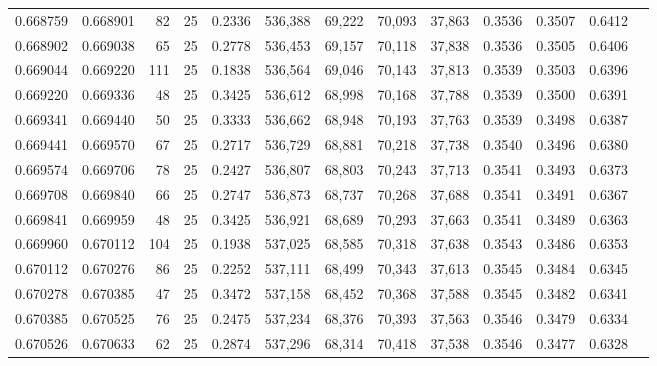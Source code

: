 \begin{tabular}{rrrrrrrrrrrrr}
0.668759 & 0.668901 &    82 &  25 &                                     0.2336 & 536,388 &  69,222 &  70,093 &  37,863 & 0.3536 & 0.3507 & 0.6412 \\
0.668902 & 0.669038 &    65 &  25 &                                     0.2778 & 536,453 &  69,157 &  70,118 &  37,838 & 0.3536 & 0.3505 & 0.6406 \\
0.669044 & 0.669220 &   111 &  25 &                                     0.1838 & 536,564 &  69,046 &  70,143 &  37,813 & 0.3539 & 0.3503 & 0.6396 \\
0.669220 & 0.669336 &    48 &  25 &                                     0.3425 & 536,612 &  68,998 &  70,168 &  37,788 & 0.3539 & 0.3500 & 0.6391 \\
0.669341 & 0.669440 &    50 &  25 &                                     0.3333 & 536,662 &  68,948 &  70,193 &  37,763 & 0.3539 & 0.3498 & 0.6387 \\
0.669441 & 0.669570 &    67 &  25 &                                     0.2717 & 536,729 &  68,881 &  70,218 &  37,738 & 0.3540 & 0.3496 & 0.6380 \\
0.669574 & 0.669706 &    78 &  25 &                                     0.2427 & 536,807 &  68,803 &  70,243 &  37,713 & 0.3541 & 0.3493 & 0.6373 \\
0.669708 & 0.669840 &    66 &  25 &                                     0.2747 & 536,873 &  68,737 &  70,268 &  37,688 & 0.3541 & 0.3491 & 0.6367 \\
0.669841 & 0.669959 &    48 &  25 &                                     0.3425 & 536,921 &  68,689 &  70,293 &  37,663 & 0.3541 & 0.3489 & 0.6363 \\
0.669960 & 0.670112 &   104 &  25 &                                     0.1938 & 537,025 &  68,585 &  70,318 &  37,638 & 0.3543 & 0.3486 & 0.6353 \\
0.670112 & 0.670276 &    86 &  25 &                                     0.2252 & 537,111 &  68,499 &  70,343 &  37,613 & 0.3545 & 0.3484 & 0.6345 \\
0.670278 & 0.670385 &    47 &  25 &                                     0.3472 & 537,158 &  68,452 &  70,368 &  37,588 & 0.3545 & 0.3482 & 0.6341 \\
0.670385 & 0.670525 &    76 &  25 &                                     0.2475 & 537,234 &  68,376 &  70,393 &  37,563 & 0.3546 & 0.3479 & 0.6334 \\
0.670526 & 0.670633 &    62 &  25 &                                     0.2874 & 537,296 &  68,314 &  70,418 &  37,538 & 0.3546 & 0.3477 & 0.6328 \\

\end{tabular}

